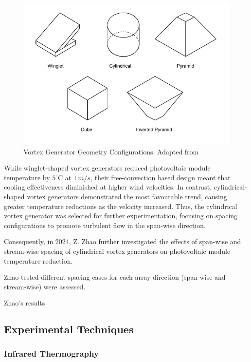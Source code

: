 \begin{figure}[ht]
    \centering
    \includegraphics[width=0.75\linewidth, trim=0 10 0 10, clip]{Figures/vortex_generator_shapes.pdf}
    \caption{Vortex Generator Geometry Configurations. Adapted from \cite{Chaudhury2024TheConvection}}
    \label{fig:vortex_generator_shapes}
\end{figure}

While winglet-shaped vortex generators reduced photovoltaic module temperature by $5^\circ \text{C}$ at $1\,m/s$, their free-convection based design meant that cooling effectiveness diminished at higher wind velocities. In contrast, cylindrical-shaped vortex generators demonstrated the most favourable trend, causing greater temperature reductions as the velocity increased. Thus, the cylindrical vortex generator was selected for further experimentation, focusing on spacing configurations to promote turbulent flow in the span-wise direction. \cite{Chaudhury2024TheConvection}

Consequently, in 2024, Z. Zhao further investigated the effects of span-wise and stream-wise spacing of cylindrical vortex generators on photovoltaic module temperature reduction.\par



Zhao tested different spacing cases for each array direction (span-wise and stream-wise) were assessed.\par
Zhao's results


\pagebreak
\subsection{Experimental Techniques}
\subsubsection{Infrared Thermography}
